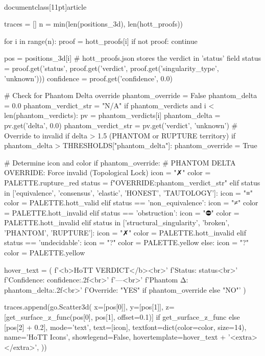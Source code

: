 \\documentclass[11pt]{article}
\begin{document}
\begin{CodeBlock}
{{{    traces = []
    n = min(len(positions_3d), len(hott_proofs))

    for i in range(n):
        proof = hott_proofs[i]
        if not proof:
            continue

        pos = positions_3d[i]
        # hott_proofs.json stores the verdict in 'status' field
        status = proof.get('status', proof.get('verdict', proof.get('singularity_type', 'unknown')))
        confidence = proof.get('confidence', 0.0)

        # Check for Phantom Delta override
        phantom_override = False
        phantom_delta = 0.0
        phantom_verdict_str = "N/A"
        if phantom_verdicts and i < len(phantom_verdicts):
            pv = phantom_verdicts[i]
            phantom_delta = pv.get('delta', 0.0)
            phantom_verdict_str = pv.get('verdict', 'unknown')
            # Override to invalid if delta > 1.5 (PHANTOM or RUPTURE territory)
            if phantom_delta > THRESHOLDS["phantom_delta"]:
                phantom_override = True

        # Determine icon and color
        if phantom_override:
            # PHANTOM DELTA OVERRIDE: Force invalid (Topological Lock)
            icon = "✗"
            color = PALETTE.rupture_red
            status = f"OVERRIDE:{phantom_verdict_str}"
        elif status in ['equivalence', 'consensus', 'elastic', 'HONEST', 'TAUTOLOGY']:
            icon = "≡"
            color = PALETTE.hott_valid
        elif status == 'non_equivalence':
            icon = "≠"
            color = PALETTE.hott_invalid
        elif status == 'obstruction':
            icon = "⛔"
            color = PALETTE.hott_invalid
        elif status in ['structural_singularity', 'broken', 'PHANTOM', 'RUPTURE']:
            icon = "✗"
            color = PALETTE.hott_invalid
        elif status == 'undecidable':
            icon = "?"
            color = PALETTE.yellow
        else:
            icon = "?"
            color = PALETTE.yellow

        hover_text = (
            f'<b>HoTT VERDICT</b><br>'
            f'Status: {status}<br>'
            f'Confidence: {confidence:.2f}<br>'
            f'---<br>'
            f'Phantom Δ: {phantom_delta:.2f}<br>'
            f'Override: {"YES" if phantom_override else "NO"}'
        )

        traces.append(go.Scatter3d(
            x=[pos[0]],
            y=[pos[1]],
            z=[get_surface_z_func(pos[0], pos[1], offset=0.1)] if get_surface_z_func else [pos[2] + 0.2],
            mode='text',
            text=[icon],
            textfont=dict(color=color, size=14),
            name='HoTT Icons',
            showlegend=False,
            hovertemplate=hover_text + '<extra></extra>',
        ))

}}}
\end{CodeBlock}
\end{document}
